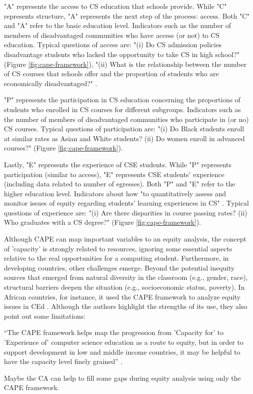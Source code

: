 "A" represents the access to \gls{CS} education that schools provide. While "C" represents structure, "A" represents the next step of the process: access. Both "C" and "A" refer to the basic education level. Indicators such as the number of members of disadvantaged communities who have access (or not) to \gls{CS} education. Typical questions of access are: "(i) Do \gls{CS} admission policies disadvantage students who lacked the opportunity to take \gls{CS} in high school?" (Figure \ref{fig:cape-framework}), "(ii) What is the relationship between the number of \gls{CS} courses that schools offer and the proportion of students who are economically disadvantaged?" \cite[p.~10]{warner:2022}.

"P" represents the participation in \gls{CS} education concerning the proportions of students who enrolled in \gls{CS} courses for different subgroups. Indicators such as the number of members of disadvantaged communities who participate in (or no) \gls{CS} courses. Typical questions of participation are: "(i) Do Black students enroll at similar rates as Asian and White students? (ii) Do women enroll in advanced courses?" (Figure \ref{fig:cape-framework}). 

Lastly, "E" represents the experience of \gls{CSE} students. While "P" represents participation (similar to access), "E" represents \gls{CSE} students' experience (including data related to number of egresses). Both "P" and "E" refer to the higher education level. Indicators about how "to quantitatively assess and monitor issues of equity regarding students’ learning experiences in \gls{CS}" \cite[p.~5]{warner:2022}. Typical questions of experience are: "(i) Are there disparities in course passing rates? (ii) Who graduates with a \gls{CS} degree?" (Figure \ref{fig:cape-framework}).

Although \gls{CAPE} can map important variables to an equity analysis, the concept
of 'capacity' is strongly related to resources, ignoring some essential aspects relative to the real opportunities for a computing student. Furthermore, in developing countries, other challenges emerge. Beyond the potential inequity sources that emerged from natural diversity in the classroom (e.g., gender, race), structural barriers deepen the situation (e.g., socioeconomic status, poverty). In African countries, for instance, it used the \gls{CAPE} framework to analyze equity issues in \gls{CEd} \cite{tshukudu:2023}. Although the authors highlight the strengths of its use, they also point out some limitations: 
\begin{citacao}
    ``The \gls{CAPE} framework helps map the progression from 'Capacity for' to 'Experience of' computer science education as a route to equity, but in order to support development in low and middle income countries, it may be helpful to have the capacity level finely grained'' \cite[p.~1]{tshukudu:2023}.
\end{citacao}
Maybe the \gls{CA} can help to fill some gaps during equity analysis using only the \gls{CAPE} framework. 